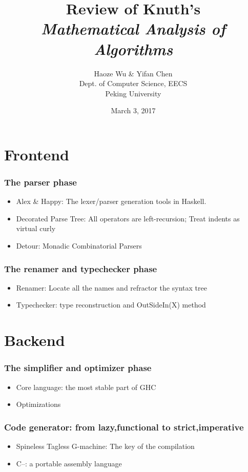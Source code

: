 \documentclass{beamer}
\title{Review of Knuth's\\ \emph{Mathematical Analysis of Algorithms}}
\author{Haoze Wu \& Yifan Chen \\
	Dept. of Computer Science, EECS \\
	Peking University
}
\date{March 3, 2017}
\begin{document}
	\begin{frame}
		\titlepage
	\end{frame}

\section{Frontend}
 \begin{frame}
 	\frametitle{The parser phase}
 	\begin{itemize}
 		\item 
 		Alex \& Happy: The lexer/parser generation tools in Haskell.
 		\item Decorated Parse Tree: All operators are left-recursion; Treat indents as virtual curly
 		\item Detour: Monadic Combinatorial Parsers
 	\end{itemize}
 \end{frame}
 \begin{frame}
 	\frametitle{The renamer and typechecker phase}
 	\begin{itemize}
 		\item Renamer: Locate all the names and refractor the syntax tree
 		\item Typechecker: type reconstruction and OutSideIn(X) method
 	\end{itemize}
 \end{frame}
\section{Backend}
 \begin{frame}
 	\frametitle{The simplifier and optimizer phase}
 	\begin{itemize}
 		\item Core language: the most stable part of GHC
 		\item Optimizations
 	\end{itemize}
 \end{frame}
 \begin{frame}
 	\frametitle{Code generator: from lazy,functional to strict,imperative}
 	\begin{itemize}
 		\item Spineless Tagless G-machine: The key of the compilation
 		\item C--: a portable assembly language
 	\end{itemize} 
 \end{frame}
\end{document}
